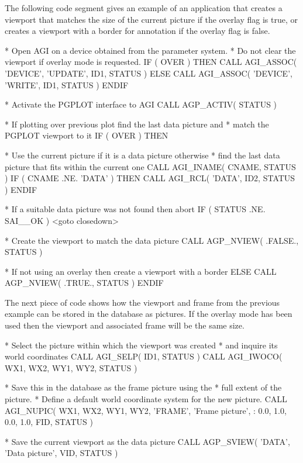\documentclass[twoside,11pt]{starlink}
\begin{document}
The following code segment gives an example of an application that
creates a viewport that matches the size of the current picture if the
overlay flag is true, or creates a viewport with a border for annotation
if the overlay flag is false.
\begin{terminalv}
    *   Open AGI on a device obtained from the parameter system.
    *   Do not clear the viewport if overlay mode is requested.
          IF ( OVER ) THEN
             CALL AGI_ASSOC( 'DEVICE', 'UPDATE', ID1, STATUS )
          ELSE
             CALL AGI_ASSOC( 'DEVICE', 'WRITE', ID1, STATUS )
          ENDIF

    *   Activate the PGPLOT interface to AGI
          CALL AGP_ACTIV( STATUS )

    *   If plotting over previous plot find the last data picture and
    *   match the PGPLOT viewport to it
          IF ( OVER ) THEN

    *   Use the current picture if it is a data picture otherwise
    *   find the last data picture that fits within the current one
             CALL AGI_INAME( CNAME, STATUS )
             IF ( CNAME .NE. 'DATA' ) THEN
                CALL AGI_RCL( 'DATA', ID2, STATUS )
             ENDIF

    *   If a suitable data picture was not found then abort
             IF ( STATUS .NE. SAI__OK ) <goto closedown>

    *   Create the viewport to match the data picture
             CALL AGP_NVIEW( .FALSE., STATUS )

    *   If not using an overlay then create a viewport with a border
          ELSE
             CALL AGP_NVIEW( .TRUE., STATUS )
          ENDIF
\end{terminalv}

The next piece of code shows how the viewport and frame from the previous
example can be stored in the database as pictures. If the overlay mode has
been used then the viewport and associated frame will be the same size.
\begin{terminalv}
    *   Select the picture within which the viewport was created
    *   and inquire its world coordinates
          CALL AGI_SELP( ID1, STATUS )
          CALL AGI_IWOCO( WX1, WX2, WY1, WY2, STATUS )

    *   Save this in the database as the frame picture using the
    *   full extent of the picture.
    *   Define a default world coordinate system for the new picture.
          CALL AGI_NUPIC( WX1, WX2, WY1, WY2, 'FRAME', 'Frame picture',
         :                0.0, 1.0, 0.0, 1.0, FID, STATUS )

    *   Save the current viewport as the data picture
          CALL AGP_SVIEW( 'DATA', 'Data picture', VID, STATUS )
\end{terminalv}
\end{document}
